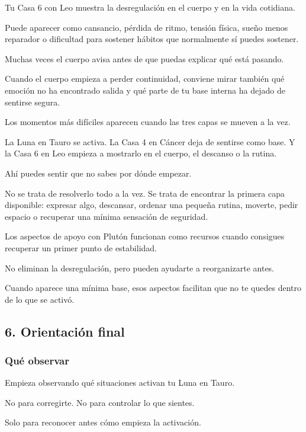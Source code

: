 \documentclass[11pt,a4paper]{article}
\begin{document}
Tu Casa 6 con Leo muestra la desregulación en el cuerpo y en la vida cotidiana.

Puede aparecer como cansancio, pérdida de ritmo, tensión física, sueño menos reparador o dificultad para sostener hábitos que normalmente sí puedes sostener.

Muchas veces el cuerpo avisa antes de que puedas explicar qué está pasando.

Cuando el cuerpo empieza a perder continuidad, conviene mirar también qué emoción no ha encontrado salida y qué parte de tu base interna ha dejado de sentirse segura.

Los momentos más difíciles aparecen cuando las tres capas se mueven a la vez.

La Luna en Tauro se activa.
La Casa 4 en Cáncer deja de sentirse como base.
Y la Casa 6 en Leo empieza a mostrarlo en el cuerpo, el descanso o la rutina.

Ahí puedes sentir que no sabes por dónde empezar.

No se trata de resolverlo todo a la vez.
Se trata de encontrar la primera capa disponible: expresar algo, descansar, ordenar una pequeña rutina, moverte, pedir espacio o recuperar una mínima sensación de seguridad.

Los aspectos de apoyo con Plutón funcionan como recursos cuando consigues recuperar un primer punto de estabilidad.

No eliminan la desregulación, pero pueden ayudarte a reorganizarte antes.

Cuando aparece una mínima base, esos aspectos facilitan que no te quedes dentro de lo que se activó.

\vspace{0.8cm}

\subsection{6. Orientación final}

\subsubsection*{Qué observar}

Empieza observando qué situaciones activan tu Luna en Tauro.

No para corregirte.
No para controlar lo que sientes.

Solo para reconocer antes cómo empieza la activación.
\end{document}
